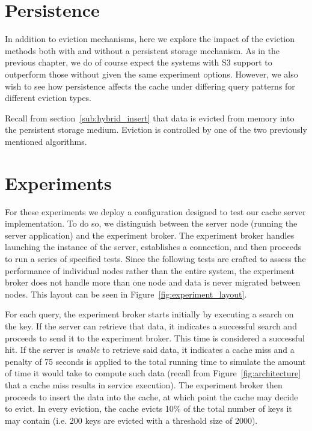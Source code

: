 \section{Persistence} %
\label{sec:persistence}
In addition to eviction mechanisms, here we explore the impact of the eviction
methods both with and without a persistent storage mechanism. As in the
previous chapter, we do of course expect the systems with S3 support to
outperform those without given the same experiment options. However, we also
wish to see how persistence affects the cache under differing query patterns
for different eviction types.

Recall from section~\ref{sub:hybrid_insert} that data is evicted from memory
into the persistent storage medium. Eviction is controlled by one of the two
previously mentioned algorithms.


\section{Experiments} %
\label{sec:experiments_eviction}
For these experiments we deploy a configuration designed to test our cache
server implementation. To do so, we distinguish between the server node
(running the server application) and the experiment broker. The experiment
broker handles launching the instance of the server, establishes a connection,
and then proceeds to run a series of specified tests. Since the following tests
are crafted to assess the performance of individual nodes rather than the
entire system, the experiment broker does not handle more than one node and
data is never migrated between nodes. This layout can be seen in
Figure~\ref{fig:experiment_layout}.

For each query, the experiment broker starts initially by executing a search on
the key. If the server can retrieve that data, it indicates a successful search
and proceeds to send it to the experiment broker. This time is considered a
successful hit. If the server is \emph{unable} to retrieve said data, it
indicates a cache miss and a penalty of 75 seconds is applied to the total
running time to simulate the amount of time it would take to compute such data
(recall from Figure~\ref{fig:architecture} that a cache miss results in service
execution). The experiment broker then proceeds to insert the data into the
cache, at which point the cache may decide to evict. In every eviction, the
cache evicts 10\% of the total number of keys it may contain (i.e. 200 keys are
evicted with a threshold size of 2000).

